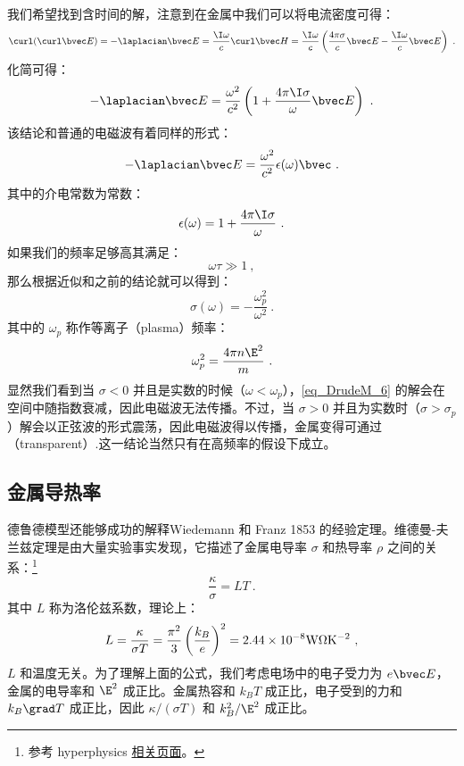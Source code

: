 我们希望找到含时间的解，注意到在金属中我们可以将电流密度可得：
\begin{equation}
\curl(\curl\bvec E)=-\laplacian \bvec E =\frac{\I\omega}{c}\curl\bvec H=\frac{\I\omega}{c}\left(\frac{4\pi\sigma}{c}\bvec E-\frac{\I\omega}{c}\bvec E\right)~.
\end{equation}
化简可得：
\begin{equation}
-\laplacian \bvec E =\frac{\omega^2}{c^2}\left(1+\frac{4\pi\I\sigma}{\omega}\bvec E\right)~.
\end{equation}
该结论和普通的电磁波有着同样的形式：
\begin{equation}\label{eq_DrudeM_6}
-\laplacian \bvec E = \frac{\omega^2}{c^2}\epsilon(\omega)\bvec ~.
\end{equation}
其中的介电常数为常数：
\begin{equation}
\epsilon(\omega)=1+\frac{4\pi\I\sigma}{\omega}~.
\end{equation}
如果我们的频率足够高其满足：
\begin{equation}
\omega\tau\gg 1~,
\end{equation}
那么根据近似和之前的结论就可以得到：
\begin{equation}
\sigma(\omega)=-\frac{\omega_p^2}{\omega^2}~.
\end{equation}
其中的 $\omega_p$ 称作等离子（plasma）频率：
\begin{equation}
\omega_p^2=\frac{4\pi n\E^2}{m}~.
\end{equation}
显然我们看到当 $\sigma<0$ 并且是实数的时候（$\omega<\omega_p$），\autoref{eq_DrudeM_6} 的解会在空间中随指数衰减，因此电磁波无法传播。不过，当 $\sigma>0$ 并且为实数时（$\sigma>\sigma_p$）解会以正弦波的形式震荡，因此电磁波得以传播，金属变得可通过（transparent）.这一结论当然只有在高频率的假设下成立。

\subsection{金属导热率}
德鲁德模型还能够成功的解释Wiedemann 和 Franz 1853 的经验定理。维德曼-夫兰兹定理是由大量实验事实发现，它描述了金属电导率 $\sigma$ 和热导率 $\rho$ 之间的关系：\footnote{参考 hyperphysics \href{http://hyperphysics.phy-astr.gsu.edu/hbase/thermo/thercond.html}{相关页面}。}
\begin{equation}
\frac{\kappa}{\sigma}=LT~.
\end{equation}
其中 $L$ 称为洛伦兹系数，理论上：
\begin{equation}\label{eq_DrudeM_47}
L=\frac{\kappa}{\sigma T}=\frac{\pi^2}{3}\left(\frac{k_B}{e}\right)^2 = 2.44\times10^{-8}\rm{W\Omega K^{-2}}~,
\end{equation}
$L$ 和温度无关。为了理解上面的公式，我们考虑电场中的电子受力为 $e\bvec E$，金属的电导率和 $\E^2$ 成正比。金属热容和 $k_B T$ 成正比，电子受到的力和 $k_B\grad T$ 成正比，因此 $\kappa/(\sigma T)$ 和 $k_B^2/\E^2$ 成正比。

